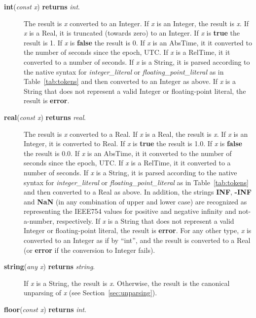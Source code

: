\documentclass{article}
\begin{document}
\begin{description}
\item[\textbf{int}(\emph{const x}) \textbf{returns} \emph{int}.]

The result is \emph{x} converted to an Integer.
If \emph{x} is an Integer, the result is \emph{x}.
If \emph{x} is a Real, it is truncated (towards zero) to an Integer.
If \emph{x} is \textbf{true} the result is 1.
If \emph{x} is \textbf{false} the result is 0.
If \emph{x} is an AbsTime, it it converted to the number of seconds since the
epoch, UTC.
If \emph{x} is a RelTime, it it converted to a number of seconds.
If \emph{x} is a String, it is parsed according to the native syntax
for \emph{integer\_literal} or \emph{floating\_point\_literal} as in
Table~\ref{tab:tokens} and then converted to an Integer as above.
If \emph{x} is a String that does not represent a valid Integer or
floating-point literal, the result is \textbf{error}.

\item[\textbf{real}(\emph{const x}) \textbf{returns} \emph{real}.]

The result is \emph{x} converted to a Real.
If \emph{x} is a Real, the result is \emph{x}.
If \emph{x} is an Integer, it is converted to Real.
If \emph{x} is \textbf{true} the result is 1.0.
If \emph{x} is \textbf{false} the result is 0.0.
If \emph{x} is an AbsTime, it it converted to the number of seconds since the
epoch, UTC.
If \emph{x} is a RelTime, it it converted to a number of seconds.
If \emph{x} is a String, it is parsed according to the native syntax
for \emph{integer\_literal} or \emph{floating\_point\_literal} as in
Table~\ref{tab:tokens} and then converted to a Real as above.
In addition, the strings \textbf{INF}, \textbf{-INF} and \textbf{NaN}
(in any combination of upper and lower case) are recognized as representing
the IEEE754 values for positive and negative infinity and not-a-number,
respectively.
If \emph{x} is a String that does not represent a valid Integer or
floating-point literal, the result is \textbf{error}.
For any other type, \emph{x} is converted to an Integer as if by ``int'', and
the result is converted to a Real (or \textbf{error} if the conversion to
Integer fails).

\item[\textbf{string}(\emph{any x}) \textbf{returns} \emph{string}.]

If \emph{x} is a String, the result is \emph{x}.
Otherwise, the result is the canonical unparsing of \emph{x} (see
Section~\ref{sec:unparsing}).

\item[\textbf{floor}(\emph{const x}) \textbf{returns} \emph{int}.]


\end{description}
\end{document}
